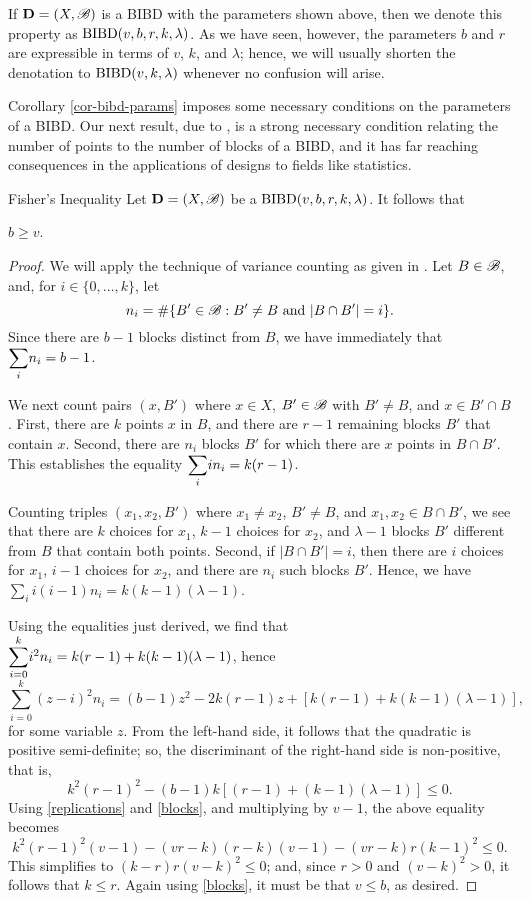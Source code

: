\documentclass[../../../main]{subfiles}
\begin{document}
If $\mathbf{D}=(X,\mathscr{B})$ is a BIBD with the parameters shown above, then we denote this property as $\text{BIBD}(v,b,r,k,\lambda)$. As we have seen, however, the parameters $b$ and $r$ are expressible in terms of $v$, $k$, and $\lambda$; hence, we will usually shorten the denotation to $\text{BIBD}(v,k,\lambda)$ whenever no confusion will arise.  

Corollary \ref{cor-bibd-params} imposes some necessary conditions on the parameters of a BIBD. Our next result, due to \cite{fisher-inequality}, is a strong necessary condition relating the number of points to the number of blocks of a BIBD, and it has far reaching consequences in the applications of designs to fields like statistics.

\begin{namedthm}{Fisher's Inequality}
 Let $\mathbf{D}=(X,\mathscr{B})$ be a $\text{BIBD}(v,b,r,k,\lambda)$. It follows that 
 \begin{defenum}
  \item\label{fisher} $b \geq v$.
 \end{defenum}
\end{namedthm}

\begin{proof}
 We will apply the technique of variance counting as given in \cite{cameron-combinatorics}. Let $B \in \mathscr{B}$, and, for $i \in \{0, \dots, k\}$, let 
 \[
 n_i = \#\{B' \in \mathscr{B} : B' \neq B \text{ and } |B \cap B'| = i\}.
 \]
 Since there are $b-1$ blocks distinct from $B$, we have immediately that $\ssum_i n_i = b-1$. 
 
 We next count pairs $(x,B')$ where $x \in X$, $B' \in \mathscr{B}$ with $B' \neq B$, and $x \in B' \cap B$. First, there are $k$ points $x$ in $B$, and there are $r-1$ remaining blocks $B'$ that contain $x$. Second, there are $n_i$ blocks $B'$ for which there are $x$ points in $B \cap B'$. This establishes the equality $\ssum_i in_i = k(r-1)$.
 
 Counting triples $(x_1,x_2,B')$ where $x_1 \neq x_2$, $B' \neq B$, and $x_1, x_2 \in B \cap B'$, we see that there are $k$ choices for $x_1$, $k-1$ choices for $x_2$, and $\lambda-1$ blocks $B'$ different from $B$ that contain both points. Second, if $|B \cap B'| = i$, then there are $i$ choices for $x_1$, $i-1$ choices for $x_2$, and there are $n_i$ such blocks $B'$. Hence, we have $\sum_i i(i-1)n_i = k(k-1)(\lambda-1)$.
 
 Using the equalities just derived, we find that $\ssum_{i=0}^k i^2n_i = k(r-1) + k(k-1)(\lambda-1)$, hence
 \[
 \sum_{i=0}^k (z-i)^2n_i = (b-1)z^2 - 2k(r-1)z + [k(r-1)+k(k-1)(\lambda-1)],
 \]
 for some variable $z$. From the left-hand side, it follows that the quadratic is positive semi-definite; so, the discriminant of the right-hand side is non-positive, that is,
 \[
 k^2(r-1)^2 - (b-1)k[(r-1)+(k-1)(\lambda-1)] \leq 0.
 \]
 Using \ref{replications} and \ref{blocks}, and multiplying by $v-1$, the above equality becomes
 \[
 k^2(r-1)^2(v-1) - (vr-k)(r-k)(v-1) - (vr-k)r(k-1)^2 \leq 0.
 \]
 This simplifies to $(k-r)r(v-k)^2 \leq 0$; and, since $r > 0$ and $(v-k)^2 > 0$, it follows that $k \leq r$. Again using \ref{blocks}, it must be that $v \leq b$, as desired.
\end{proof}
\end{document}
